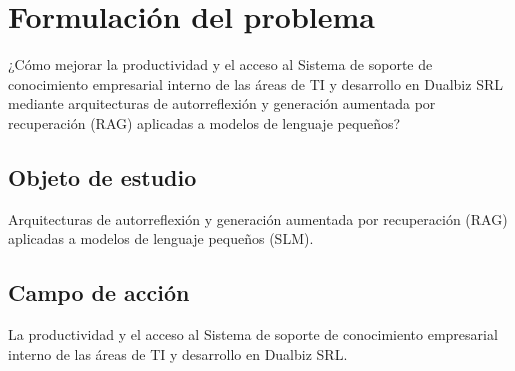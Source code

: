 \section{Formulación del problema}

¿Cómo mejorar la productividad y el acceso al Sistema de soporte de conocimiento empresarial interno de las áreas de TI y desarrollo en Dualbiz SRL mediante arquitecturas de autorreflexión y generación aumentada por recuperación (RAG) aplicadas a modelos de lenguaje pequeños?

\subsection{Objeto de estudio}

Arquitecturas de autorreflexión y generación aumentada por recuperación (RAG) aplicadas a modelos de lenguaje pequeños (SLM).

\subsection{Campo de acción}

La productividad y el acceso al Sistema de soporte de conocimiento empresarial interno de las áreas de TI y desarrollo en Dualbiz SRL.